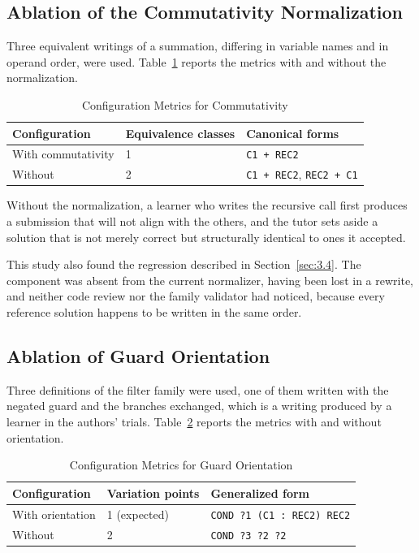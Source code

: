 \documentclass[journal]{IEEEtran}
\begin{document}
\subsection{Ablation of the Commutativity Normalization}\label{sec:8.4}
Three equivalent writings of a summation, differing in variable names
and in operand order, were used. Table~\ref{tab:5} reports the metrics with and
without the normalization.

\begin{table}[t]
\centering\scriptsize
\caption{Configuration Metrics for Commutativity}\label{tab:5}
\begin{tabular}{@{}p{1.0in}p{0.9in}p{1.1in}@{}}
\toprule
Configuration & Equivalence classes & Canonical forms \\
\midrule
With commutativity & 1 & \texttt{C1 + REC2} \\
Without & 2 & \texttt{C1 + REC2}, \texttt{REC2 + C1} \\
\bottomrule
\end{tabular}
\end{table}

Without the normalization, a learner who writes the recursive call first
produces a submission that will not align with the others, and the tutor
sets aside a solution that is not merely correct but structurally
identical to ones it accepted.

This study also found the regression described in Section~\ref{sec:3.4}. The
component was absent from the current normalizer, having been lost in a
rewrite, and neither code review nor the family validator had noticed,
because every reference solution happens to be written in the same
order.

\subsection{Ablation of Guard Orientation}\label{sec:8.5}
Three definitions of the filter family were used, one of them written
with the negated guard and the branches exchanged, which is a writing
produced by a learner in the authors' trials. Table~\ref{tab:6} reports the
metrics with and without orientation.

\begin{table}[t]
\centering\scriptsize
\caption{Configuration Metrics for Guard Orientation}\label{tab:6}
\begin{tabular}{lll}
\toprule
Configuration & Variation points & Generalized form \\
\midrule
With orientation & 1 (expected) & \texttt{COND ?1 (C1 : REC2) REC2} \\
Without & 2 & \texttt{COND ?3 ?2 ?2} \\
\bottomrule
\end{tabular}
\end{table}
\end{document}
